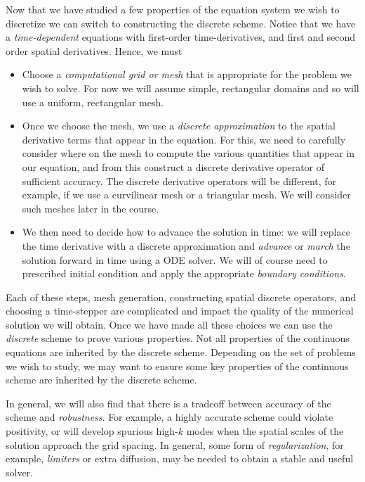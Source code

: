 \documentclass[12pt]{article}
\theoremstyle{definition}
\theoremstyle{definition}
\theoremstyle{definition}
\newcommand{\cramplist}{
	\setlength{\itemsep}{0in}
	\setlength{\partopsep}{0in}
	\setlength{\topsep}{0in}}
\begin{document}
Now that we have studied a few properties of the equation system we
wish to discretize we can switch to constructing the discrete
scheme. Notice that we have a \emph{time-dependent} equations with
first-order time-derivatives, and first and second order spatial
derivatives. Hence, we must
\begin{itemize}\cramplist
\item Choose a \emph{computational grid or mesh} that is appropriate
  for the problem we wish to solve. For now we will assume simple,
  rectangular domains and so will use a uniform, rectangular mesh.
\item Once we choose the mesh, we use a \emph{discrete approximation}
  to the spatial derivative terms that appear in the equation. For
  this, we need to carefully consider where on the mesh to compute the
  various quantities that appear in our equation, and from this
  construct a discrete derivative operator of sufficient accuracy. The
  discrete derivative operators will be different, for example, if we
  use a curvilinear mesh or a triangular mesh. We will consider such
  meshes later in the course.
\item We then need to decide how to advance the solution in time: we
  will replace the time derivative with a discrete approximation and
  \emph{advance} or \emph{march} the solution forward in time using a
  ODE solver. We will of course need to prescribed initial condition
  and apply the appropriate \emph{boundary conditions}.
\end{itemize}

Each of these steps, mesh generation, constructing spatial discrete
operators, and choosing a time-stepper are complicated and impact the
quality of the numerical solution we will obtain. Once we have made
all these choices we can use the \emph{discrete} scheme to prove
various properties. Not all properties of the continuous equations are
inherited by the discrete scheme. Depending on the set of problems we
wish to study, we may want to ensure some key properties of the
continuous scheme are inherited by the discrete scheme.

In general, we will also find that there is a tradeoff between
accuracy of the scheme and \emph{robustness}. For example, a highly
accurate scheme could violate positivity, or will develop spurious
high-$k$ modes when the spatial scales of the solution approach the
grid spacing. In general, some form of \emph{regularization}, for
example, \emph{limiters} or extra diffusion, may be needed to obtain a
stable and useful solver.
\end{document}
